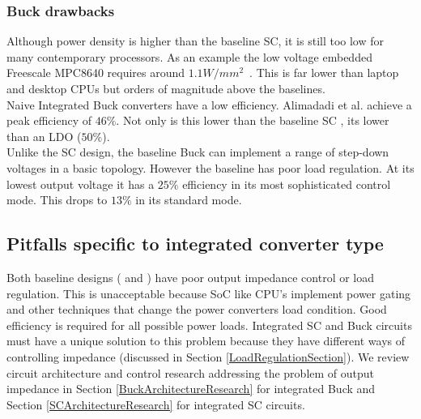 \documentclass[letterpaper,twocolumn,10pt]{article}
\begin{document}
\subsubsection{Buck drawbacks } 
Although power density is higher than the baseline SC, it is still too low for many contemporary processors. As an example the low voltage embedded Freescale MPC8640 requires around $1.1W/mm^2$~\cite{Freescale2014}. This is far lower than laptop and desktop CPUs but orders of magnitude above the baselines.\\ %
Naive Integrated Buck converters have a low efficiency. Alimadadi et al. \cite{Alimadadi2008} achieve a peak efficiency of $46\%$. Not only is this lower than the baseline SC \cite{Viraj2007}, its lower than an LDO ($50\%$).\\
Unlike the SC design, the baseline Buck can implement a range of step-down voltages in a basic topology. However the baseline has poor load regulation. At its lowest output voltage it has a $25\%$ efficiency in its most sophisticated control mode. This drops to $13\%$ in its standard mode.\\ 
\subsection{Pitfalls specific to integrated converter type}

Both baseline designs (\cite{Alimadadi2008} and \cite{Viraj2007}) have poor output impedance control or load regulation. This is unacceptable because SoC like CPU's implement power gating and other techniques that change the power converters load condition. Good efficiency is required for all possible power loads. Integrated SC and Buck circuits must have a unique solution to this problem because they have different ways of controlling impedance (discussed in Section \ref{LoadRegulationSection}). We review circuit architecture and control research addressing the problem of output impedance in Section \ref{BuckArchitectureResearch} for integrated Buck and Section \ref{SCArchitectureResearch} for integrated SC circuits.
\end{document}

